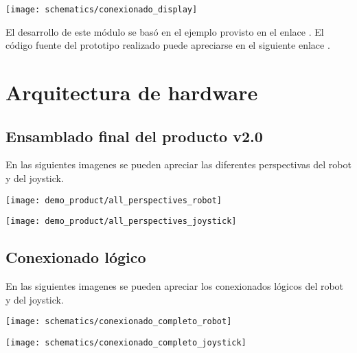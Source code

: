 \begin{center}
\texttt{[image: schematics/conexionado\_display]}
  \label{fig:conexionado_display}

\end{center}


El desarrollo de este módulo se basó en el ejemplo provisto en el enlace \cite{ESP32_Display_Example}. El código fuente del prototipo realizado puede apreciarse en el siguiente enlace \cite{ESP32_POC_display}.


\section{Arquitectura de hardware}


\subsection{Ensamblado final del producto v2.0}

En las siguientes imagenes se pueden apreciar las diferentes perspectivas del robot y del joystick.

\begin{center}
\texttt{[image: demo\_product/all\_perspectives\_robot]}
  \label{fig:conexionado_fisico}
\end{center}


\begin{center}
\texttt{[image: demo\_product/all\_perspectives\_joystick]}
  \label{fig:conexionado_fisico}
\end{center}



\subsection{Conexionado lógico }

En las siguientes imagenes se pueden apreciar los conexionados lógicos del robot y del joystick.

\begin{center}
\texttt{[image: schematics/conexionado\_completo\_robot]}
  \label{fig:conexionado_completo_robot}
\end{center}


\begin{center}
\texttt{[image: schematics/conexionado\_completo\_joystick]}
  \label{fig:conexionado_completo_joystick}
\end{center}


